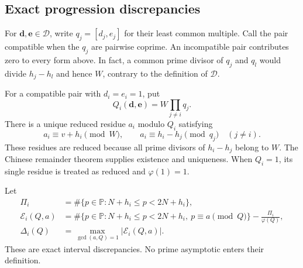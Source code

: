 \subsection{Exact progression discrepancies}

For $\boldsymbol d,\boldsymbol e\in\mathcal D$, write
$q_j=[d_j,e_j]$ for their least common multiple.
Call the pair compatible when the $q_j$ are pairwise coprime.
An incompatible pair contributes zero to every form above.
In fact, a common prime divisor of $q_j$ and $q_l$ would divide
$h_j-h_l$ and hence $W$, contrary to the definition of $\mathcal D$.

For a compatible pair with $d_i=e_i=1$, put
\[
 Q_i(\boldsymbol d,\boldsymbol e)=W\prod_{j\ne i}q_j.
\]
There is a unique reduced residue $a_i$ modulo $Q_i$ satisfying
\[
 a_i\equiv v+h_i\pmod W,\qquad
 a_i\equiv h_i-h_j\pmod {q_j}\quad(j\ne i).
\]
These residues are reduced because all prime divisors of $h_i-h_j$
belong to $W$.  The Chinese remainder theorem supplies existence and uniqueness.
When $Q_i=1$, its single residue is treated as reduced and $\varphi(1)=1$.

Let
\begin{align*}
 \Pi_i&=\#\{p\in\mathbb P:N+h_i\leq p<2N+h_i\},\\
 \mathcal E_i(Q,a)
   &=\#\{p\in\mathbb P:N+h_i\leq p<2N+h_i,
                               \ p\equiv a\pmod Q\}
                   -\frac{\Pi_i}{\varphi(Q)},\\
 \Delta_i(Q)&=\max_{\gcd(a,Q)=1}|\mathcal E_i(Q,a)|.
\end{align*}
These are exact interval discrepancies.  No prime asymptotic enters their definition.

